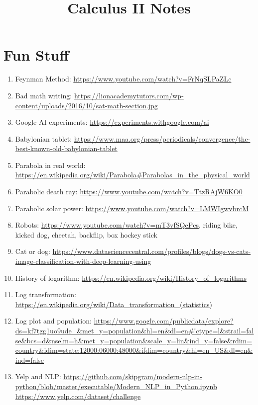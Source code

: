 \documentclass{article}
\title{Calculus II Notes}
\date
\begin{document}
\maketitle
\large


\tableofcontents


\section{Fun Stuff}

\begin{enumerate}
\item Feynman Method: \url{https://www.youtube.com/watch?v=FrNqSLPaZLc}
\item Bad math writing: \url{https://lionacademytutors.com/wp-content/uploads/2016/10/sat-math-section.jpg}
\item Google AI experiments: \url{https://experiments.withgoogle.com/ai}
\item Babylonian tablet: \url{https://www.maa.org/press/periodicals/convergence/the-best-known-old-babylonian-tablet}
\item Parabola in real world: \url{https://en.wikipedia.org/wiki/Parabola#Parabolas_in_the_physical_world}
\item Parabolic death ray: \url{https://www.youtube.com/watch?v=TtzRAjW6KO0}
\item Parabolic solar power: \url{https://www.youtube.com/watch?v=LMWIgwvbrcM}
\item Robots: \url{https://www.youtube.com/watch?v=mT3vfSQePcs}, riding bike, kicked dog, cheetah, backflip, box hockey stick
\item Cat or dog: \url{https://www.datasciencecentral.com/profiles/blogs/dogs-vs-cats-image-classification-with-deep-learning-using}
\item History of logarithm: \url{https://en.wikipedia.org/wiki/History_of_logarithms}
\item Log transformation: \url{https://en.wikipedia.org/wiki/Data_transformation_(statistics)}
\item Log plot and population: \url{https://www.google.com/publicdata/explore?ds=kf7tgg1uo9ude_&met_y=population&hl=en&dl=en#!ctype=l&strail=false&bcs=d&nselm=h&met_y=population&scale_y=lin&ind_y=false&rdim=country&idim=state:12000:06000:48000&ifdim=country&hl=en_US&dl=en&ind=false} 
\item Yelp and NLP: \url{https://github.com/skipgram/modern-nlp-in-python/blob/master/executable/Modern_NLP_in_Python.ipynb} \url{https://www.yelp.com/dataset/challenge}

\end{enumerate}
\end{document}

